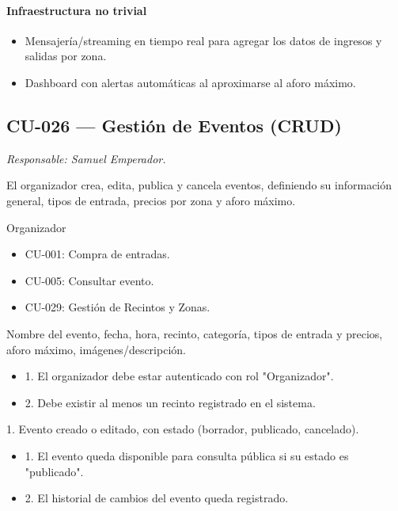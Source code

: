 \paragraph{Infraestructura no trivial}
\begin{itemize}[leftmargin=1.4em, topsep=1pt]
  \item Mensajería/streaming en tiempo real para agregar los datos de ingresos y salidas por zona.
  \item Dashboard con alertas automáticas al aproximarse al aforo máximo.
\end{itemize}

\subsection{CU-026 --- Gestión de Eventos (CRUD)}
\label{cu:cu-026}
\textit{Responsable: Samuel Emperador.}

\begin{description}[leftmargin=!, labelwidth=3.4cm, style=nextline, topsep=3pt]
\item[Objetivo] El organizador crea, edita, publica y cancela eventos, definiendo su información general, tipos de entrada, precios por zona y aforo máximo.

\item[Actores] Organizador

\item[CU relacionados] \hfill
\begin{itemize}[leftmargin=1.2em, topsep=1pt]
  \item CU-001: Compra de entradas.
  \item CU-005: Consultar evento.
  \item CU-029: Gestión de Recintos y Zonas.
\end{itemize}

\item[Entradas] Nombre del evento, fecha, hora, recinto, categoría, tipos de entrada y precios, aforo máximo, imágenes/descripción.

\item[Pre-condiciones] \hfill
\begin{itemize}[leftmargin=1.2em, topsep=1pt]
  \item 1. El organizador debe estar autenticado con rol "Organizador".
  \item 2. Debe existir al menos un recinto registrado en el sistema.
\end{itemize}

\item[Salidas] 1. Evento creado o editado, con estado (borrador, publicado, cancelado).

\item[Post-condiciones] \hfill
\begin{itemize}[leftmargin=1.2em, topsep=1pt]
  \item 1. El evento queda disponible para consulta pública si su estado es "publicado".
  \item 2. El historial de cambios del evento queda registrado.
\end{itemize}

\end{description}

